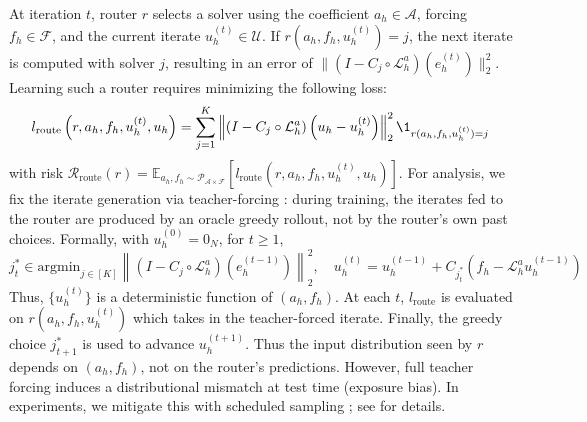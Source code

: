 \documentclass{article}
\begin{document}
At iteration $t$, router $r$ selects a solver using the coefficient $a_h \in \mathcal{A}$, forcing $f_h \in \mathcal{F}$, and the current iterate $u^{(t)}_h \in \mathcal{U}$. If $r(a_h, f_h, u^{(t)}_h) = j$, the next iterate is computed with solver $j$, resulting in an error of $\|( I - C_{j} \circ  \mathcal{L}_{h}^a)(e^{(t)}_h)\|^2_2$. Learning such a router requires minimizing the following loss:
\begin{equation} \label{eq:routerloss}
    l_{\text{route}}\left(r, a_h, f_h, u^{(t)}_h, u_h\right) = \sum_{j = 1}^K \left\|\left( I - C_{j} \circ \mathcal{L}_{h}^a\right)\left(u_h - u^{(t)}_h\right)\right\|^2_2\1_{r(a_h, f_h, u^{(t)}_h) = j}
\end{equation}
with risk $\mathcal{R}_{\text{route}}\left(r\right) = \mathbb{E}_{a_h, f_h \sim \mathcal{P}_{\mathcal{A} \times \mathcal{F}}}[l_{\text{route}}(r, a_h, f_h, u^{(t)}_h, u_h)]$.  
For analysis, we fix the iterate generation via teacher-forcing \citep{williams1989learning,lamb2016professor}: during training, 
the iterates fed to the router are produced by an oracle greedy rollout, not by the router's own past choices. Formally, with $u_h^{(0)} = 0_N$, for $t \geq 1$, 
\begin{equation*}
    j^*_t \in \text{argmin}_{j \in [K]} \left\|\left( I - C_{j} \circ \mathcal{L}_{h}^a\right)\left(e^{(t - 1)}_h\right)\right\|^2_2, \quad u^{(t)}_h = u^{(t - 1)}_h + C_{j^{*}_t}\left(f_h - \mathcal{L}_h^a u_h^{(t - 1)}\right)
\end{equation*}
Thus, $\{u^{(t)}_h\}$ is a deterministic function of $(a_h, f_h)$. At each $t$, $l_{\text{route}}$ is evaluated on $r(a_h, f_h, u^{(t)}_h)$ which takes in the teacher-forced iterate. Finally, the greedy choice $j^*_{t + 1}$ is used to advance $u^{(t + 1)}_h$. Thus the input distribution seen by $r$ depends on $(a_h, f_h)$, not on the router's predictions. However, full teacher forcing induces a distributional mismatch at test time (exposure bias). In experiments, we mitigate this with scheduled sampling \citep{bengio2015scheduled}; see  for details.

\end{document}
